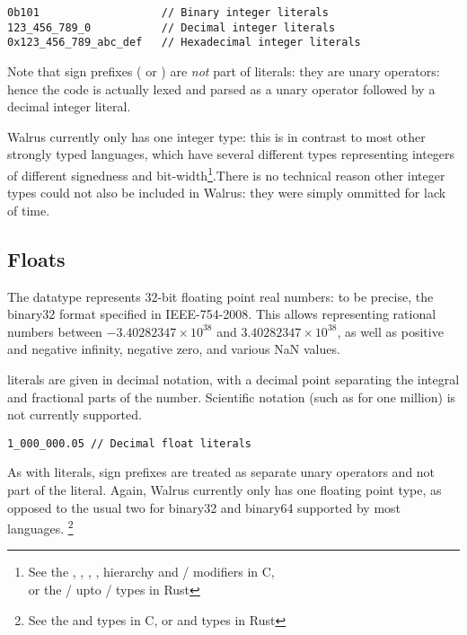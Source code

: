 \begin{verbatim}
0b101                   // Binary integer literals
123_456_789_0           // Decimal integer literals
0x123_456_789_abc_def   // Hexadecimal integer literals
\end{verbatim}


Note that sign prefixes (\rust{+} or \rust{-}) are \textit{not} part of  literals:
they are unary operators: hence the code  is actually lexed and parsed as
a unary operator followed by a decimal integer literal.

Walrus currently only has one integer type: this is in contrast to most other strongly
typed languages, which have several different types representing integers of different
signedness and bit-width\footnote{See the , , , ,
     hierarchy and / modifiers in C, \\
    or the / upto / types in Rust}.There is no technical reason other integer types could not also be included in Walrus:
they were simply ommitted for lack of time.

\subsection{Floats}\label{section:reference:floats}
The  datatype represents 32-bit floating point real numbers: to be precise,
the binary32 format specified in IEEE-754-2008. This allows representing rational numbers
between $-3.40282347 \times 10^{38}$ and $3.40282347 \times 10^{38}$, as well as positive and negative infinity, negative zero, and various NaN values.

 literals are given in decimal notation, with a decimal point separating the
integral and fractional parts of the number.
Scientific notation (such as  for one million) is not currently supported.

\begin{verbatim}
1_000_000.05 // Decimal float literals
\end{verbatim}

As with  literals, sign prefixes are treated as separate unary operators and not part of the
 literal. Again, Walrus currently only has one floating point type, as opposed to the usual
two for binary32 and binary64 supported by most languages.
\footnote{See the  and  types in C,
    or  and  types in Rust}

